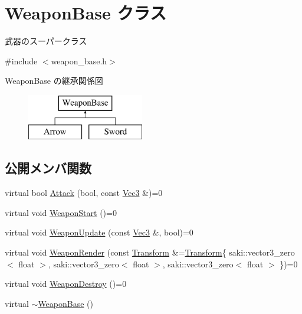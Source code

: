 \hypertarget{class_weapon_base}{}\section{Weapon\+Base クラス}
\label{class_weapon_base}


武器のスーパークラス  




{\ttfamily \#include $<$weapon\+\_\+base.\+h$>$}

Weapon\+Base の継承関係図\begin{figure}[H]
\begin{center}
\leavevmode
\includegraphics[height=2.000000cm]{class_weapon_base}
\end{center}
\end{figure}
\subsection*{公開メンバ関数}
\begin{DoxyCompactItemize}
\item 
virtual bool \mbox{\hyperlink{class_weapon_base_a1bab9c7fb9524db754bebbbcbf6c2fd9}{Attack}} (bool, const \mbox{\hyperlink{common_8h_ab1cb35b3a17c398d8ef71d5f779808bf}{Vec3}} \&)=0
\item 
virtual void \mbox{\hyperlink{class_weapon_base_a25cd4c351638b76377e93341a9545712}{Weapon\+Start}} ()=0
\item 
virtual void \mbox{\hyperlink{class_weapon_base_aa1e3d02353273ab72a71cc3a1563636a}{Weapon\+Update}} (const \mbox{\hyperlink{common_8h_ab1cb35b3a17c398d8ef71d5f779808bf}{Vec3}} \&, bool)=0
\item 
virtual void \mbox{\hyperlink{class_weapon_base_af308d16d3892c3ffaeedf74b08e761b9}{Weapon\+Render}} (const \mbox{\hyperlink{common_8h_a1c43cb8f0d8a41901f3ce4c67dbbce20}{Transform}} \&=\mbox{\hyperlink{common_8h_a1c43cb8f0d8a41901f3ce4c67dbbce20}{Transform}}\{ saki\+::vector3\+\_\+zero$<$ float $>$, saki\+::vector3\+\_\+zero$<$ float $>$, saki\+::vector3\+\_\+zero$<$ float $>$ \})=0
\item 
virtual void \mbox{\hyperlink{class_weapon_base_a417784a8c8bf73cd398a77b922fc110c}{Weapon\+Destroy}} ()=0
\item 
virtual \mbox{\hyperlink{class_weapon_base_a311bee6c8496581f21068867be48762f}{$\sim$\+Weapon\+Base}} ()
\end{DoxyCompactItemize}
